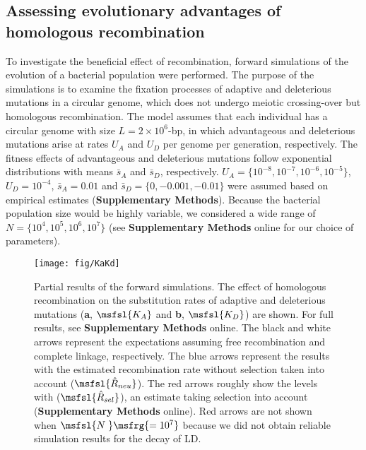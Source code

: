 \documentclass[twoside,twocolumn, letterpaper]{article}
\renewcommand{\baselinestretch}{1}
\begin{document}
\subsection*{Assessing evolutionary advantages of homologous recombination}
To investigate the beneficial effect of recombination, forward simulations of the evolution of a bacterial population were performed. The purpose of the simulations is to examine the fixation processes of adaptive and deleterious mutations in a circular genome, which does not undergo meiotic crossing-over but homologous recombination. The model assumes that each individual has a circular genome with size $L=2\times10^{6}$-bp, in which advantageous and deleterious mutations arise at rates $U_{A}$ and $U_{D}$ per genome per generation, respectively. The fitness effects of advantageous and deleterious mutations follow exponential distributions with means $\bar{s}_{A}$ and $\bar{s}_{D}$, respectively. $U_{A}=\{10^{-8}, 10^{-7}, 10^{-6}, 10^{-5}\}$,  $U_{D}=10^{-4}$, $\bar{s}_{A}=0.01$ and $\bar{s}_{D}=\{0,-0.001,-0.01\}$ were assumed based on empirical estimates ({\bf Supplementary Methods}). Because the bacterial population size would be highly variable, we considered a wide range of $N=\{10^4, 10^5, 10^6, 10^7\}$ (see {\bf Supplementary Methods} online for our choice of parameters). 

\begin{figure*}[tb]   
  \begin{center}
   \vspace{-2mm}
   \texttt{[image: fig/KaKd]}
   \renewcommand{\baselinestretch}{0.9}
   \vspace{-3mm}
   \caption{Partial results of the forward simulations. The effect of homologous recombination on the substitution rates of adaptive and deleterious mutations (\textbf{a}, $\msfsl{K_A}$ and \textbf{b}, $\msfsl{K_D}$) are shown. For full results, see {\bfseries Supplementary Methods} online.
The black and white arrows represent the expectations assuming free recombination and complete linkage, respectively. The blue arrows represent the results with the estimated recombination rate without selection taken into account ($\msfsl{\hat{R}_{neu}}$). The red arrows roughly show the levels with ($\msfsl{\hat{R}_{sel}}$), an estimate taking selection into account ({\bfseries Supplementary Methods} online). Red arrows are not shown when $\msfsl{N\;}\msfrg{ =10^7}$ because we did not obtain reliable simulation results for the decay of LD. 
   }
\vspace{-6mm}
    \label{ka}
  \end{center}
\end{figure*}
\end{document}
